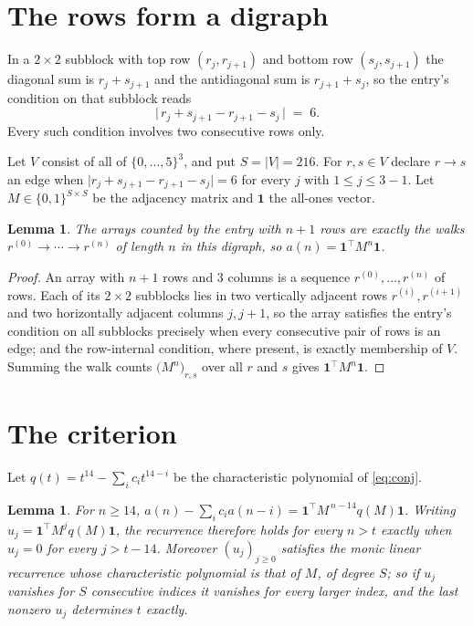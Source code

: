 \documentclass[11pt,a4paper]{article}
\theoremstyle{plain}
\newtheorem{lemma}[theorem]{Lemma}
\theoremstyle{definition}
\begin{document}
\section{The rows form a digraph}

In a $2\times2$ subblock with top row $(r_j,r_{j+1})$ and bottom row $(s_j,s_{j+1})$ the
diagonal sum is $r_j+s_{j+1}$ and the antidiagonal sum is $r_{j+1}+s_j$, so the entry's
condition on that subblock reads
\[
\bigl|\,r_j+s_{j+1}-r_{j+1}-s_j\,\bigr|\;=\;6.
\]
Every such condition involves two consecutive rows only.

Let $V$ consist of all of $\{0,\dots,5\}^{3}$, and put $S=|V|=216$. For $r,s\in V$ declare $r\to s$ an edge
when $\bigl|r_j+s_{j+1}-r_{j+1}-s_j\bigr|=6$ for every $j$ with
$1\le j\le3-1$. Let $M\in\{0,1\}^{S\times S}$ be the adjacency matrix and $\mathbf{1}$
the all-ones vector.

\begin{lemma}\label{lem:walk}
The arrays counted by the entry with $n+1$ rows are exactly the walks
$r^{(0)}\to\cdots\to r^{(n)}$ of length $n$ in this digraph, so
$a(n)=\mathbf{1}^{\!\top}M^{n}\mathbf{1}$.
\end{lemma}

\begin{proof}
An array with $n+1$ rows and $3$ columns is a sequence $r^{(0)},\dots,r^{(n)}$ of
rows. Each of its $2\times2$ subblocks lies in two vertically adjacent rows
$r^{(i)},r^{(i+1)}$ and two horizontally adjacent columns $j,j+1$, so the array satisfies
the entry's condition on all subblocks precisely when every consecutive pair of rows is an
edge; and the row-internal condition, where present, is exactly membership of $V$. Summing
the walk counts $\bigl(M^{n}\bigr)_{r,s}$ over all $r$ and $s$ gives
$\mathbf{1}^{\!\top}M^{n}\mathbf{1}$.
\end{proof}

\section{The criterion}

Let $q(t)=t^{14}-\sum_i c_i t^{14-i}$ be the characteristic polynomial of
\eqref{eq:conj}.

\begin{lemma}\label{lem:crit}
For $n\ge14$,
$a(n)-\sum_i c_i a(n-i)=\mathbf{1}^{\!\top}M^{\,n-14}q(M)\mathbf{1}$. Writing
$u_j=\mathbf{1}^{\!\top}M^{j}q(M)\mathbf{1}$, the recurrence therefore holds for every
$n>t$ exactly when $u_j=0$ for every $j>t-14$. Moreover $(u_j)_{j\ge0}$ satisfies the
monic linear recurrence whose characteristic polynomial is that of $M$, of degree $S$; so
if $u_j$ vanishes for $S$ consecutive indices it vanishes for every larger index, and the
last nonzero $u_j$ determines $t$ exactly.
\end{lemma}
\end{document}
